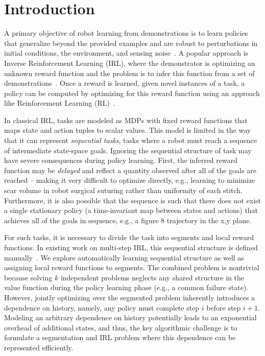 \section{Introduction}
A primary objective of robot learning from demonstrations is to learn policies that generalize beyond the provided examples and are robust to perturbations in initial conditions, the environment, and sensing noise~\cite{argall2009survey}.
A popular approach is Inverse Reinforcement Learning (IRL), where the demonstrator is optimizing 
an unknown reward function and the problem is to infer this function from a set of demonstrations~\cite{DBLP:conf/nips/KolterAN07, coates2008learning, abbeel2004apprenticeship}.
Once a reward is learned, given novel instances of a task, a policy can be computed by optimizing for this reward function using an approach like Reinforcement Learning (RL)~\cite{abbeel2004apprenticeship}.

In classical IRL, tasks are modeled as MDPs with fixed reward functions that maps state and action tuples to scalar values. 
This model is limited in the way that it can represent \emph{sequential tasks}, tasks where a robot must reach a sequence of intermediate state-space goals.
Ignoring the sequential structure of task may have severe consequences during policy learning.
First, the inferred reward function may be \emph{delayed}
and reflect a quantity observed after all of the goals are reached -- making it very difficult to optimize directly, e.g., learning to minimize scar volume in robot surgical suturing rather than uniformity of each stitch.
Furthermore, it is also possible that the sequence is such that there does not exist a single stationary policy (a time-invariant map between states and actions) that achieves all of the goals in sequence, e.g., a figure 8 trajectory in the x,y plane.

For such tasks, it is necessary to divide the task into segments and local reward functions.
In existing work on multi-step IRL, this sequential structure is defined manually~\cite{DBLP:conf/nips/KolterAN07}.
We explore automatically learning sequential structure as well as assigning local reward functions to segments.
The combined problem is nontrivial because solving $k$ independent problems neglects any shared structure in the value function during the policy learning phase (e.g., a common failure state).
However, jointly optimizing over the segmented problem inherently introduces a dependence on history, namely, any policy must complete step $i$ before step $i+1$.
Modeling an arbitrary dependence on history potentially leads to an exponential overhead of additional states, and thus, the key algorithmic challenge is to formulate a segmentation and IRL problem where this dependence can be represented efficiently.

